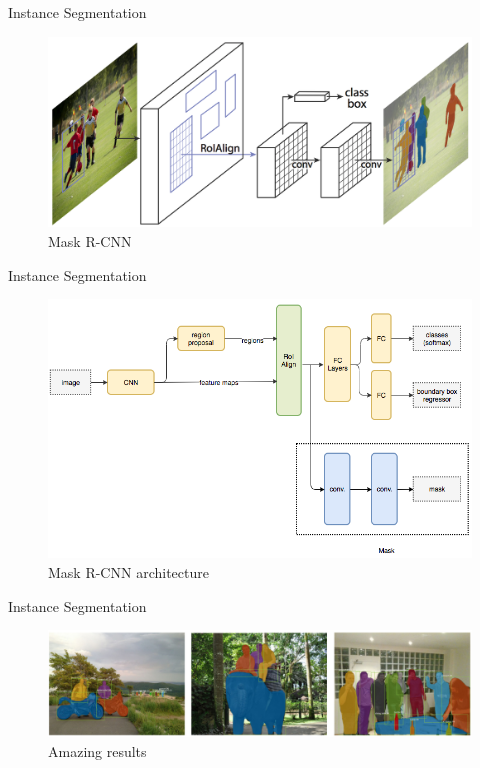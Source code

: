 \documentclass[aspectratio=169]{beamer}
\begin{document}
\begin{frame}{Instance Segmentation}
\begin{figure}
    \centering
    \includegraphics[scale=.2]{demo/figs/mask.png}
    \caption{Mask R-CNN}
\end{figure}
\end{frame}

\begin{frame}{Instance Segmentation}
\begin{figure}
    \centering
    \includegraphics[scale=.35]{demo/figs/mask2.png}
    \caption{Mask R-CNN architecture}
\end{figure}
\end{frame}

\begin{frame}{Instance Segmentation}
\begin{figure}
    \centering
    \includegraphics[scale=.35]{demo/figs/maskr.png}
    \caption{Amazing results}
\end{figure}
\end{frame}
\end{document}
